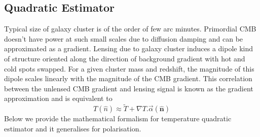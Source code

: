 \subsection{Quadratic Estimator}

Typical size of galaxy cluster is of the order of few arc minutes. 
Primordial CMB doesn't have power at such small scales due to diffusion damping \cite{Silk} and can be approximated as a gradient. 
Lensing due to galaxy cluster induces a dipole kind of structure oriented along the direction of background gradient with hot and cold spots swapped.
For a given cluster mass and redshift, the magnitude of this dipole scales linearly with the magnitude of the CMB gradient.
This correlation between the unlensed CMB gradient and lensing signal is known as the gradient approximation and is equivalent to
\begin{equation}
T (\hat{n})\approx \tilde{T}+ \nabla T . \vec{\alpha}(\hat{\textbf{n}})
\end{equation}
Below we provide the mathematical formalism for temperature quadratic estimator and it generalises for polarisation.

